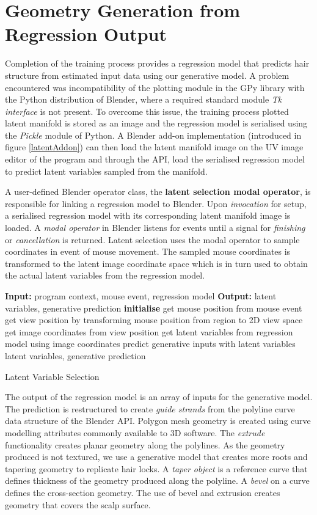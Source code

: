 \documentclass[ %
author={Dillon Keith Diep},
supervisor={Dr. Carl Henrik Ek},
degree={MEng},
title={ART-CG Hair:},
subtitle={Assisted Real-time Content Generation of Stylised Virtual Hair},
type={Research},
year={2017} ]{dissertation}
\begin{document}
\section{Geometry Generation from Regression Output}
Completion of the training process provides a regression model that predicts hair structure from estimated input data using our generative model. A problem encountered was incompatibility of the plotting module in the GPy library with the Python distribution of Blender, where a required standard module \textit{Tk interface} is not present. To overcome this issue, the training process plotted latent manifold is stored as an image and the regression model is serialised using the \textit{Pickle} module of Python. A Blender add-on implementation (introduced in figure \ref{latentAddon}) can then load the latent manifold image on the UV image editor of the program and through the API, load the serialised regression model to predict latent variables sampled from the manifold.

A user-defined Blender operator class, the \textbf{latent selection modal operator}, is responsible for linking a regression model to Blender. Upon \textit{invocation} for setup, a serialised regression model with its corresponding latent manifold image is loaded. A \textit{modal operator} in Blender listens for events until a signal for \textit{finishing} or \textit{cancellation} is returned. Latent selection uses the modal operator to sample coordinates in event of mouse movement. The sampled mouse coordinates is transformed to the latent image coordinate space which is in turn used to obtain the actual latent variables from the regression model. 

\begin{algorithm}[!h]
	\algrule
	\textbf{Input:} program context, mouse event, regression model\;
	\textbf{Output:} latent variables, generative prediction\;
	\algrule
	\textbf{initialise}\;
	{
		get mouse position from mouse event\;
		get view position by transforming mouse position from region to 2D view space\;
		get image coordinates from view position\;
		get latent variables from regression model using image coordinates\;
		predict generative inputs with latent variables\;
	}
	\Return latent variables, generative prediction
	\caption{Latent Variable Selection}
\end{algorithm}

The output of the regression model is an array of inputs for the generative model. The prediction is restructured to create \textit{guide strands} from the polyline curve data structure of the Blender API. Polygon mesh geometry is created using curve modelling attributes commonly available to 3D software. The \textit{extrude} functionality creates planar geometry along the polylines. As the geometry produced is not textured, we use a generative model that creates more roots and tapering geometry to replicate hair locks.
A \textit{taper object} is a reference curve that defines thickness of the geometry produced along the polyline. A \textit{bevel} on a curve defines the cross-section geometry. The use of bevel and extrusion creates geometry that covers the scalp surface.
\end{document}

